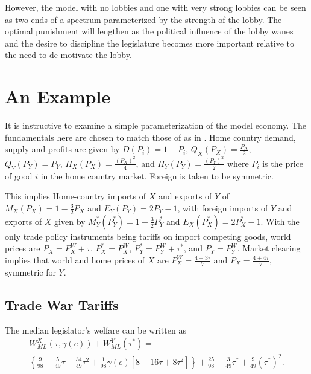 \documentclass[authoryear, review]{elsarticle}
\newcommand{\ve}{\theta}
\newcommand{\ga}{\gamma}
\begin{document}
However, the model with no lobbies and one with very strong lobbies can be seen as two ends of a spectrum parameterized by the strength of the lobby. The optimal punishment will lengthen as the political influence of the lobby wanes and the desire to discipline the legislature becomes more important relative to the need to de-motivate the lobby.



\section{An Example}
\label{sec:example}
It is instructive to examine a simple parameterization of the model economy. The fundamentals here are chosen to match those of \citet{bs2005} as in \citet{buzard2013b}. Home country demand, supply and profits are given by $D(P_i) = 1 - P_i$, $Q_X(P_X) = \frac{P_X}{2}$, $Q_Y(P_Y) = P_Y$, $\Pi_X(P_X) = \frac{(P_X)^2}{4}$, and $\Pi_Y(P_Y) = \frac{(P_Y)^2}{2}$ where $P_i$ is the price of good $i$ in the home country market. %
Foreign is taken to be symmetric.

This implies Home-country imports of $X$ and exports of $Y$ of $M_X(P_X)= 1 - \frac{3}{2}P_X$ and $E_Y(P_Y)= 2P_Y -1$, with foreign imports of $Y$ and exports of $X$ given by $M_Y^*(P_Y^*)= 1 - \frac{3}{2}P_Y^*$ and $E_X(P_X^*)= 2P_X^* -1$. With the only trade policy instruments being tariffs on import competing goods, world prices are $P_X = P_X^W + \tau$, $P_X^* = P_X^W$, $P_Y^* = P_Y^W + \tau^*$, and $P_Y = P_Y^W$. Market clearing implies that world and home prices of $X$ are $P_X^W = \frac{4-3\tau}{7}$ and $P_X = \frac{4+4\tau}{7}$, symmetric for $Y$. \\

\subsection{Trade War Tariffs}
The median legislator's welfare can be written as 
\begin{multline*}
  W_{\mathit{ML}}^X(\tau,\ga(e)) + W_{\mathit{ML}}^Y(\tau^*) = \\
	\left\{\frac{9}{98} - \frac{5}{49}\tau - \frac{34}{49}\tau^2 +\frac{1}{98}\ga(e)\left[ 8 + 16\tau + 8\tau^2 \right] \right\}+ \frac{25}{98} - \frac{3}{49}\tau^* + \frac{9}{49}(\tau^*)^2.
\end{multline*}
\end{document}
